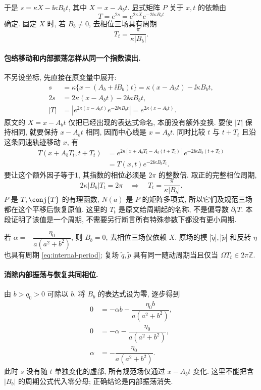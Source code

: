 于是 $s=\kappa X-\ii\kappa B_bt$, 其中 $X=x-A_bt$. 显式矩阵 $P$ 关于 $x,t$ 的依赖由
\[
T=e^{2s}=e^{2\kappa X}e^{-2\ii\kappa B_bt}
\]
确定. 固定 $X$ 时, 若 $B_b\ne0$, 去相位三场具有周期
\begin{equation}\label{eq:internal-period}
T_t=\dfrac{\pi}{\kappa|B_b|}.
\end{equation}
\paragraph{包络移动和内部振荡怎样从同一个指数读出.}
不另设坐标, 先直接在原变量中展开:
\begin{align*}
s&=\kappa\{x-(A_b+\ii B_b)t\}
=\kappa(x-A_bt)-\ii\kappa B_bt,\\
2s&=2\kappa(x-A_bt)-2\ii\kappa B_bt,\\
|T|&=\left|e^{2\kappa(x-A_bt)}e^{-2\ii\kappa B_bt}\right|
=e^{2\kappa(x-A_bt)}.
\end{align*}
原文的 $X=x-A_bt$ 仅把已经出现的表达式命名, 本册没有额外变换. 要使 $|T|$ 保持相同, 就要保持 $x-A_bt$ 相同, 因而中心线是 $x=A_bt$. 同时比较 $t$ 与 $t+T_t$ 且沿这条同速轨迹移动 $x$, 有
\begin{align*}
T(x+A_bT_t,t+T_t)
&=e^{2\kappa[x+A_bT_t-A_b(t+T_t)]}
e^{-2\ii\kappa B_b(t+T_t)}\\
&=T(x,t)e^{-2\ii\kappa B_bT_t}.
\end{align*}
要让这个额外因子等于1, 其指数的相位必须是 $2\pi$ 的整数倍. 取正的完整相位周期,
\[
2\kappa|B_b|T_t=2\pi
\quad\Longrightarrow\quad
T_t=\dfrac{\pi}{\kappa|B_b|}.
\]
$P$ 是 $T,\conj{T}$ 的有理函数, $N(a)$ 是 $P$ 的矩阵多项式, 所以它们及规范三场都在这个平移后恢复原值. 这里的 $T_t$ 是原文给周期起的名称, 不是偏导数 $\partial_tT$. 本段证明了该值是一个周期, 不需要另行断言所有特殊参数下都没有更小周期.

若 $\alpha=-\dfrac{\eta_0}{a(a^2+b^2)}$, 则 $B_b=0$, 去相位三场仅依赖 $X$. 原场的模 $|\widetilde q|,|\widetilde p|$ 和反转 $\eta$ 也具有周期 \eqref{eq:internal-period}; 复场 $\widetilde q,\widetilde p$ 具有同一随动周期当且仅当 $\Omega T_t\in2\pi\mathbb Z$.

\paragraph{消除内部振荡与恢复共同相位.}
由 $b>q_0>0$ 可除以 $b$. 将 $B_b$ 的表达式设为零, 逐步得到
\begin{align*}
0&=-\alpha b-\dfrac{\eta_0b}{a(a^2+b^2)},\\
0&=-\alpha-\dfrac{\eta_0}{a(a^2+b^2)},\\
\alpha&=-\dfrac{\eta_0}{a(a^2+b^2)}.
\end{align*}
此时 $s$ 没有随 $t$ 单独变化的虚部, 所有规范场仅通过 $x-A_bt$ 变化. 这里不能把含 $|B_b|$ 的周期公式代入零分母; 正确结论是内部振荡消失.

